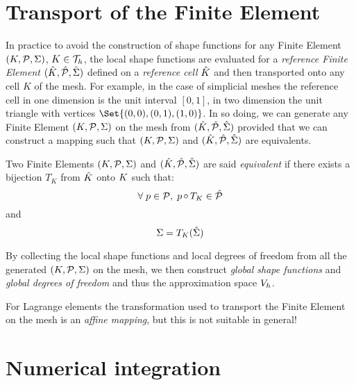 \section{Transport of the Finite Element}

In practice to avoid the construction of shape functions for any Finite Element ${({K},{\mathcal P}, {\Sigma})}$, $K \in {\mathcal T}_h$, the local shape functions are evaluated for a \textit{reference Finite Element} ${({\hat {{K}}},{\hat {{\mathcal P}}}, {\hat{{\Sigma}}})}$ defined on a \textit{reference cell} ${\hat {{K}}}$ and then transported onto any cell $K$ of the mesh.
For example, in the case of simplicial meshes the reference cell in one dimension is the unit interval $[0,1]$, in two dimension the unit triangle with vertices $\Set{(0,0),(0,1),(1,0)}$.
In so doing, we can generate any Finite Element ${({K},{\mathcal P}, {\Sigma})}$ on the mesh from ${({\hat {{K}}},{\hat {{\mathcal P}}}, {\hat{{\Sigma}}})}$ provided that we can construct a mapping such that ${({K},{\mathcal P}, {\Sigma})}$ and ${({\hat {{K}}},{\hat {{\mathcal P}}}, {\hat{{\Sigma}}})}$ are equivalents.

\begin{dfntn}
Two Finite Elements ${({K},{\mathcal P}, {\Sigma})}$ and ${({\hat {{K}}},{\hat {{\mathcal P}}}, {\hat{{\Sigma}}})}$ are said \textit{equivalent} if there exists a bijection $T_K$ from ${\hat {{K}}}$ onto ${K}$  such that:
\begin{equation*}
{\forall\;} p \in {\mathcal P},\; p\mathop\circ T_K \in {\hat {{\mathcal P}}}
\end{equation*}
and
\begin{equation*}
\Sigma = T_K({\hat{{\Sigma}}})
\end{equation*}
\end{dfntn}

\medskip
By collecting the local shape functions and local degrees of freedom from all the generated ${({K},{\mathcal P}, {\Sigma})}$ on the mesh, we then construct \textit{global shape functions} and \textit{global degrees of freedom} and thus the approximation space ${{V}}_h$.

\medskip
For Lagrange elements the transformation used to transport the Finite Element on the mesh is an \textit{affine mapping}, but this is not suitable in general!



\section{Numerical integration}

